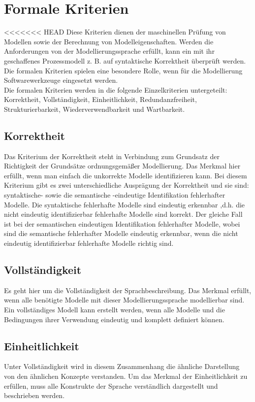 \section{Formale Kriterien}  
<<<<<<< HEAD
Diese Kriterien dienen der maschinellen Prüfung von Modellen sowie der Berechnung von Modelleigenschaften. Werden die Anforderungen von der Modellierungssprache erfüllt, kann ein mit ihr geschaffenes Prozessmodell z. B. auf syntaktische Korrektheit überprüft werden. Die formalen Kriterien spielen eine besondere Rolle, wenn für die Modellierung Softwarewerkzeuge eingesetzt werden.\cite{MT007}\\
Die formalen Kriterien werden in die folgende Einzelkriterien untergeteilt:  Korrektheit, Vollständigkeit, Einheitlichkeit, Redundanzfreiheit, Strukturierbarkeit, Wiederverwendbarkeit und Wartbarkeit.
\subsection{Korrektheit}
Das Kriterium der Korrektheit steht in Verbindung zum Grundsatz der Richtigkeit der Grundsätze ordnungsgemäßer Modellierung.
Das Merkmal hier erfüllt, wenn man einfach die unkorrekte Modelle identifizieren kann.
Bei diesem Kriterium gibt es zwei unterschiedliche Ausprägung der Korrektheit und sie sind: syntaktische- sowie die semantische -eindeutige Identifikation fehlerhafter Modelle. 
Die syntaktische fehlerhafte Modelle sind eindeutig erkennbar ,d.h. die nicht eindeutig identifizierbar fehlerhafte Modelle sind korrekt. Der gleiche Fall ist bei der semantischen eindeutigen Identifikation fehlerhafter Modelle, wobei sind die semantische fehlerhafter Modelle eindeutig erkennbar, wenn die nicht eindeutig identifizierbar fehlerhafte Modelle richtig sind.
\subsection{Vollständigkeit}
Es geht hier um die Vollständigkeit der Sprachbeschreibung. Das Merkmal erfüllt, wenn alle benötigte Modelle mit dieser Modellierungssprache modellierbar sind.
Ein vollständiges Modell kann erstellt werden, wenn alle Modelle und die Bedingungen ihrer Verwendung eindeutig und komplett definiert können.
\subsection{Einheitlichkeit}
Unter Vollständigkeit wird in diesem Zusammenhang die ähnliche Darstellung von den ähnlichen Konzepte verstanden.
Um das Merkmal der Einheitlichkeit zu erfüllen, muss alle Konstrukte der Sprache verständlich dargestellt und beschrieben werden.
